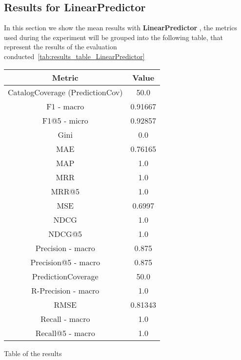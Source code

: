 \documentclass[11pt]{article}
\begin{document}
\subsection{Results for LinearPredictor}\label{subsec:LinearPredictor}
In this section we show the mean results with \textbf{ LinearPredictor }, the metrics used during the experiment will be
grouped into the following table, that represent the results of the evaluation conducted~\ref{tab:results_table_LinearPredictor}

\begin{center}
    \begin{tabular}{|c|c|}
        \hline
        \textbf{Metric} & \textbf{Value} \\ \hline
                CatalogCoverage (PredictionCov) & 50.0 \\ \hline
                F1 - macro & 0.91667 \\ \hline
                F1@5 - micro & 0.92857 \\ \hline
                Gini & 0.0 \\ \hline
                MAE & 0.76165 \\ \hline
                MAP & 1.0 \\ \hline
                MRR & 1.0 \\ \hline
                MRR@5 & 1.0 \\ \hline
                MSE & 0.6997 \\ \hline
                NDCG & 1.0 \\ \hline
                NDCG@5 & 1.0 \\ \hline
                Precision - macro & 0.875 \\ \hline
                Precision@5 - macro & 0.875 \\ \hline
                PredictionCoverage & 50.0 \\ \hline
                R-Precision - macro & 1.0 \\ \hline
                RMSE & 0.81343 \\ \hline
                Recall - macro & 1.0 \\ \hline
                Recall@5 - macro & 1.0 \\ \hline
             \end{tabular}
    \captionsetup{type=table}
    \caption{Table of the results}
    \label{tab:results_table_LinearPredictor}
\end{center}
\hfill\break
\hfill\break
\end{document}
